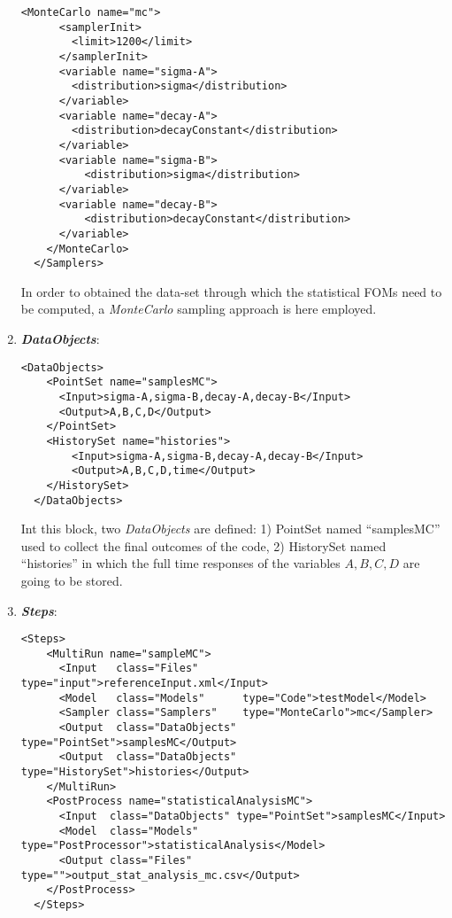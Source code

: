 \begin{enumerate}
\begin{lstlisting}[style=XML,morekeywords={arg,extension,pauseAtEnd,overwrite}]
    <MonteCarlo name="mc">
      <samplerInit>
        <limit>1200</limit>
      </samplerInit>
      <variable name="sigma-A">
        <distribution>sigma</distribution>
      </variable>
      <variable name="decay-A">
        <distribution>decayConstant</distribution>
      </variable>
      <variable name="sigma-B">
          <distribution>sigma</distribution>
      </variable>
      <variable name="decay-B">
          <distribution>decayConstant</distribution>
      </variable>
    </MonteCarlo>
  </Samplers>
\end{lstlisting}
  In order to obtained the data-set through which the statistical FOMs need to be computed, a \textit{MonteCarlo} sampling approach is here employed.
   \item \textbf{\textit{DataObjects}}:
\begin{lstlisting}[style=XML,morekeywords={arg,extension,pauseAtEnd,overwrite}]
  <DataObjects>
    <PointSet name="samplesMC">
      <Input>sigma-A,sigma-B,decay-A,decay-B</Input>
      <Output>A,B,C,D</Output>
    </PointSet>
    <HistorySet name="histories">
        <Input>sigma-A,sigma-B,decay-A,decay-B</Input>
        <Output>A,B,C,D,time</Output>
    </HistorySet>
  </DataObjects>
\end{lstlisting}
  Int this block, two \textit{DataObjects} are defined: 
  1) PointSet named ``samplesMC'' used to collect the final outcomes of 
  the code, 
  2) HistorySet named ``histories'' in which the full time responses of the 
  variables $A,B,C,D$ are going to be stored.

   \item \textbf{\textit{Steps}}:   
\begin{lstlisting}[style=XML,morekeywords={arg,extension,pauseAtEnd,overwrite}]
  <Steps>
    <MultiRun name="sampleMC">
      <Input   class="Files"       type="input">referenceInput.xml</Input>
      <Model   class="Models"      type="Code">testModel</Model>
      <Sampler class="Samplers"    type="MonteCarlo">mc</Sampler>
      <Output  class="DataObjects" type="PointSet">samplesMC</Output>
      <Output  class="DataObjects" type="HistorySet">histories</Output>
    </MultiRun>
    <PostProcess name="statisticalAnalysisMC">
      <Input  class="DataObjects" type="PointSet">samplesMC</Input>
      <Model  class="Models"      type="PostProcessor">statisticalAnalysis</Model>
      <Output class="Files"       type="">output_stat_analysis_mc.csv</Output>
    </PostProcess>
  </Steps>
\end{lstlisting}


\end{enumerate}
